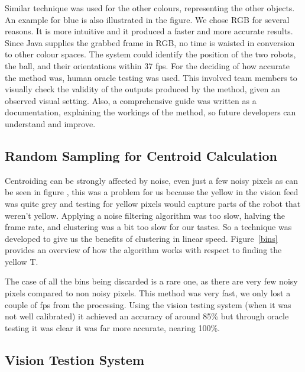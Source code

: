 Similar technique was used for the other colours, representing the other objects. An example for blue is also illustrated in the figure. We chose RGB for several reasons. It is more intuitive and it produced a faster and more accurate results. Since Java supplies the grabbed frame in RGB, no time is waisted in conversion to other colour spaces. The system could identify the position of the two robots, the ball, and their orientations within 37 fps. For the deciding of how accurate the method was, human oracle testing was used. This involved team members to visually check the validity of the outputs produced by the method, given an observed visual setting. Also, a comprehensive guide was written as a documentation, explaining the workings of the method, so future developers can understand and improve. 

\subsection{Random Sampling for Centroid Calculation}

Centroiding can be strongly affected by noise, even just a few noisy pixels as can be seen in figure \cite{vis1}, this was a problem for us because the yellow in the vision feed was quite grey and testing for yellow pixels would capture parts of the robot that weren't yellow.  Applying a noise filtering algorithm was too slow, halving the frame rate, and clustering was a bit too slow for our tastes.  So a technique was developed to give us the benefits of clustering in linear speed.  Figure~\ref{bins} provides an overview of how the algorithm works with respect to finding the yellow T.

The case of all the bins being discarded is a rare one, as there are very few noisy pixels compared to non noisy pixels.  This method was very fast, we only lost a couple of fps from the processing.  Using the vision testing system (when it was not well calibrated) it achieved an accuracy of around 85\% but through oracle testing it was clear it was far more accurate, nearing 100\%.

\subsection{Vision Testion System}

